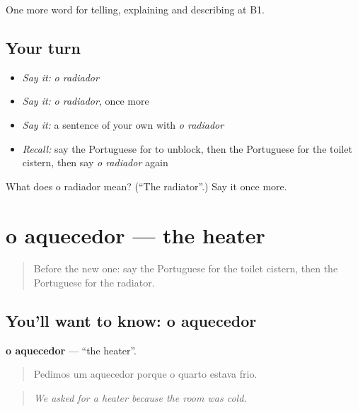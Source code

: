 \begin{grammarlens}[title={What you've built}]
One more word for telling, explaining and describing at B1.
\end{grammarlens}

\subsection*{Your turn}
\begin{itemize}
\raggedright
  \item \emph{Say it:} \emph{o radiador}
  \item \emph{Say it:} \emph{o radiador}, once more
  \item \emph{Say it:} a sentence of your own with \emph{o radiador}
  \item \emph{Recall:} say the Portuguese for to unblock, then the Portuguese for the toilet cistern, then say \emph{o radiador} again
\end{itemize}

\begin{tcolorbox}[breakable,colback=teal!4,colframe=teal!35!black,title={Before you move on}]
What does o radiador mean? (\textquotedblleft{}The radiator\textquotedblright{}.) Say it once more.
\end{tcolorbox}
\section[o aquecedor]{o aquecedor — the heater}

\label{lesson:PT-C431-aquecedor}



\begin{quote}
Before the new one: say the Portuguese for the toilet cistern, then the Portuguese for the radiator.
\end{quote}

\subsection*{You'll want to know: o aquecedor}
\textbf{o aquecedor} — \textquotedblleft{}the heater\textquotedblright{}.

\begin{quote}
Pedimos um aquecedor porque o quarto estava frio.
\end{quote}

\begin{quote}
\emph{We asked for a heater because the room was cold.}
\end{quote}

